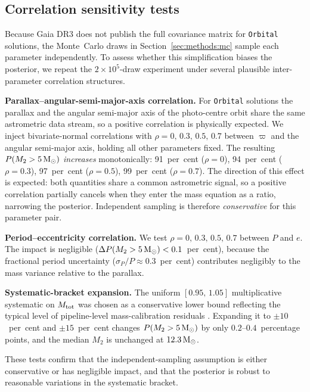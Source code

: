 \documentclass[usenatbib,fleqn]{mnras}
\newcommand{\Msun}{{\rm M}_\odot}
\begin{document}
\subsection{Correlation sensitivity tests}
\label{sec:methods:correlation}

Because Gaia DR3 does not publish the full covariance matrix for
\texttt{Orbital} solutions, the Monte~Carlo draws in
Section~\ref{sec:methods:mc} sample each parameter independently.
To assess whether this simplification biases the posterior, we
repeat the $2\times10^5$-draw experiment under several plausible
inter-parameter correlation structures.

\textbf{Parallax--angular-semi-major-axis correlation.}  For
\texttt{Orbital} solutions the parallax and the angular semi-major
axis of the photo-centre orbit share the same astrometric data
stream, so a positive correlation is physically expected.  We
inject bivariate-normal correlations with
$\rho = 0,\,0.3,\,0.5,\,0.7$ between $\varpi$ and the angular
semi-major axis, holding all other parameters fixed.  The
resulting $P(M_2 > 5\,\Msun)$ \emph{increases} monotonically:
91~per~cent ($\rho = 0$), 94~per~cent ($\rho = 0.3$),
97~per~cent ($\rho = 0.5$), 99~per~cent ($\rho = 0.7$).  The
direction of this effect is expected: both quantities share a
common astrometric signal, so a positive correlation partially
cancels when they enter the mass equation as a ratio, narrowing
the posterior.  Independent sampling is therefore
\emph{conservative} for this parameter pair.

\textbf{Period--eccentricity correlation.}  We test
$\rho = 0,\,0.3,\,0.5,\,0.7$ between $P$ and $e$.  The impact is
negligible ($\Delta P(M_2 > 5\,\Msun) < 0.1$~per~cent), because
the fractional period uncertainty ($\sigma_P/P \approx 0.3$~per~cent)
contributes negligibly to the mass variance relative to the
parallax.

\textbf{Systematic-bracket expansion.}  The uniform
$[0.95,\,1.05]$ multiplicative systematic on $M_{\rm tot}$
was chosen as a conservative lower bound reflecting the typical
level of pipeline-level mass-calibration residuals
\citep{Halbwachs2023}.  Expanding it to $\pm 10$~per~cent and
$\pm 15$~per~cent changes $P(M_2 > 5\,\Msun)$ by only
$0.2$--$0.4$~percentage points, and the median $M_2$ is unchanged
at $12.3\,\Msun$.

These tests confirm that the independent-sampling assumption is
either conservative or has negligible impact, and that the
posterior is robust to reasonable variations in the systematic
bracket.
\end{document}
